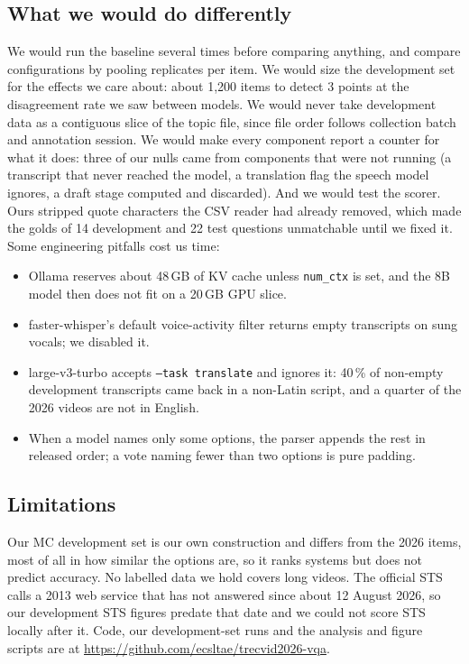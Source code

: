 \documentclass[sigconf,nonacm]{acmart}
\begin{document}
\subsection{What we would do differently}

We would run the baseline several times before comparing anything, and compare
configurations by pooling replicates per item. We would size the development set
for the effects we care about: about 1,200 items to detect 3 points at the
disagreement rate we saw between models. We would never take
development data as a contiguous slice of the topic file, since file order
follows collection batch and annotation session. We would make every component
report a counter for what it does: three of our nulls came from components that
were not running (a transcript that never reached the model, a translation flag
the speech model ignores, a draft stage computed and discarded). And we would
test the scorer. Ours stripped quote characters the CSV reader had already
removed, which made the golds of 14 development and 22 test questions
unmatchable until we fixed it. Some engineering pitfalls cost us time:
\begin{itemize}\setlength{\itemsep}{1pt}
\item Ollama reserves about 48\,GB of KV cache unless \texttt{num\_ctx} is set,
and the 8B model then does not fit on a 20\,GB GPU slice.
\item faster-whisper's default voice-activity filter returns empty transcripts
on sung vocals; we disabled it.
\item large-v3-turbo accepts \texttt{--task translate} and ignores it: 40\,\% of
non-empty development transcripts came back in a non-Latin script, and a quarter
of the 2026 videos are not in English.
\item When a model names only some options, the parser appends the rest in
released order; a vote naming fewer than two options is pure padding.
\end{itemize}

\subsection{Limitations}

Our MC development set is our own construction and differs from the 2026 items,
most of all in how similar the options are, so it ranks systems but does not
predict accuracy. No labelled data we hold covers long videos. The official STS
calls a 2013 web service that has not answered since about 12 August 2026, so our
development STS figures predate that date and we could not score STS locally
after it. Code, our development-set runs and the analysis and figure scripts are at
\url{https://github.com/ecsltae/trecvid2026-vqa}.
\end{document}
